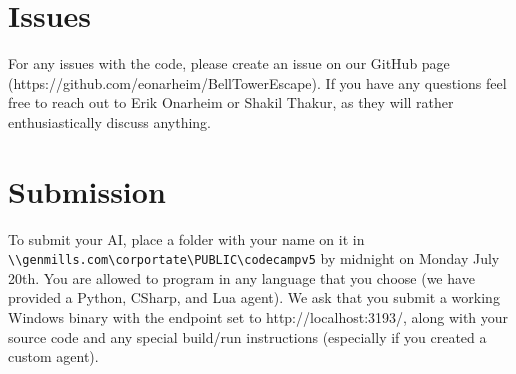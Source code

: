 \documentclass{article}
\begin{document}
\section*{Issues}
For any issues with the code, please create an issue on our GitHub page (https://github.com/eonarheim/BellTowerEscape). If you have any questions feel free to reach out to Erik Onarheim or Shakil Thakur, as they will rather enthusiastically discuss anything.

\section*{Submission}
To submit your AI, place a folder with your name on it in \verb|\\genmills.com\corportate\PUBLIC\codecampv5| by midnight on Monday July 20th. You are allowed to program in any language that you choose (we have provided a Python, CSharp, and Lua agent). We ask that you submit a working Windows binary with the endpoint set to http://localhost:3193/, along with your source code and any special build/run instructions (especially if you created a custom agent).
\end{document}
